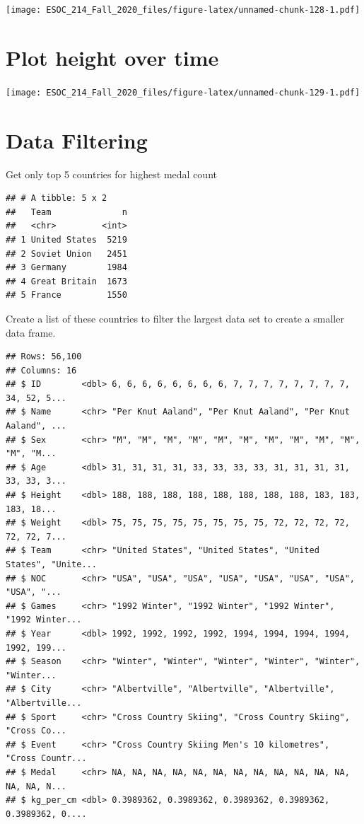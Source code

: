\documentclass[
]{book}
\begin{document}
\texttt{[image: ESOC\_214\_Fall\_2020\_files/figure-latex/unnamed-chunk-128-1.pdf]}

\hypertarget{plot-height-over-time}{%
\section{Plot height over time}\label{plot-height-over-time}}

\texttt{[image: ESOC\_214\_Fall\_2020\_files/figure-latex/unnamed-chunk-129-1.pdf]}

\hypertarget{data-filtering}{%
\section{Data Filtering}\label{data-filtering}}

Get only top 5 countries for highest medal count

\begin{verbatim}
## # A tibble: 5 x 2
##   Team              n
##   <chr>         <int>
## 1 United States  5219
## 2 Soviet Union   2451
## 3 Germany        1984
## 4 Great Britain  1673
## 5 France         1550
\end{verbatim}

Create a list of these countries to filter the largest data set to create a smaller data frame.

\begin{verbatim}
## Rows: 56,100
## Columns: 16
## $ ID        <dbl> 6, 6, 6, 6, 6, 6, 6, 6, 7, 7, 7, 7, 7, 7, 7, 7, 34, 52, 5...
## $ Name      <chr> "Per Knut Aaland", "Per Knut Aaland", "Per Knut Aaland", ...
## $ Sex       <chr> "M", "M", "M", "M", "M", "M", "M", "M", "M", "M", "M", "M...
## $ Age       <dbl> 31, 31, 31, 31, 33, 33, 33, 33, 31, 31, 31, 31, 33, 33, 3...
## $ Height    <dbl> 188, 188, 188, 188, 188, 188, 188, 188, 183, 183, 183, 18...
## $ Weight    <dbl> 75, 75, 75, 75, 75, 75, 75, 75, 72, 72, 72, 72, 72, 72, 7...
## $ Team      <chr> "United States", "United States", "United States", "Unite...
## $ NOC       <chr> "USA", "USA", "USA", "USA", "USA", "USA", "USA", "USA", "...
## $ Games     <chr> "1992 Winter", "1992 Winter", "1992 Winter", "1992 Winter...
## $ Year      <dbl> 1992, 1992, 1992, 1992, 1994, 1994, 1994, 1994, 1992, 199...
## $ Season    <chr> "Winter", "Winter", "Winter", "Winter", "Winter", "Winter...
## $ City      <chr> "Albertville", "Albertville", "Albertville", "Albertville...
## $ Sport     <chr> "Cross Country Skiing", "Cross Country Skiing", "Cross Co...
## $ Event     <chr> "Cross Country Skiing Men's 10 kilometres", "Cross Countr...
## $ Medal     <chr> NA, NA, NA, NA, NA, NA, NA, NA, NA, NA, NA, NA, NA, NA, N...
## $ kg_per_cm <dbl> 0.3989362, 0.3989362, 0.3989362, 0.3989362, 0.3989362, 0....
\end{verbatim}
\end{document}
